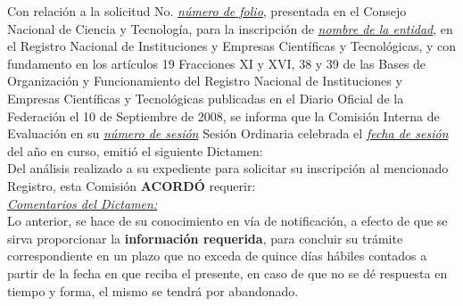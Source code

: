 

\noindent Con relación a la solicitud No. \underline{{\it número de folio}}, presentada en el Consejo Nacional de Ciencia y Tecnología, para la inscripción de \underline{{\it nombre de la entidad}}, en el Registro Nacional de Instituciones y Empresas Científicas y Tecnológicas, y con fundamento en los artículos 19 Fracciones XI y XVI, 38 y 39 de las Bases de Organización y Funcionamiento del Registro Nacional de Instituciones y Empresas Científicas y Tecnológicas publicadas en el Diario Oficial de la Federación el 10 de Septiembre de 2008, se informa que la Comisión Interna de Evaluación en su \underline{{\it número de sesión}} Sesión Ordinaria celebrada el \underline{{\it fecha de sesión}} del año en curso, emitió el siguiente Dictamen:\\

\noindent Del análisis realizado a su expediente para solicitar su inscripción al mencionado Registro, esta Comisión {\bf ACORDÓ} requerir:\\


\underline{{\it Comentarios del Dictamen:}}\\

\noindent Lo anterior, se hace de su conocimiento en vía de notificación, a efecto de que se sirva proporcionar la {\bf información requerida}, para concluir su trámite correspondiente en un plazo que no exceda de quince días hábiles contados a partir de la fecha en que reciba el presente, en caso de que no se dé respuesta en tiempo y forma, el mismo se tendrá por abandonado.\\


